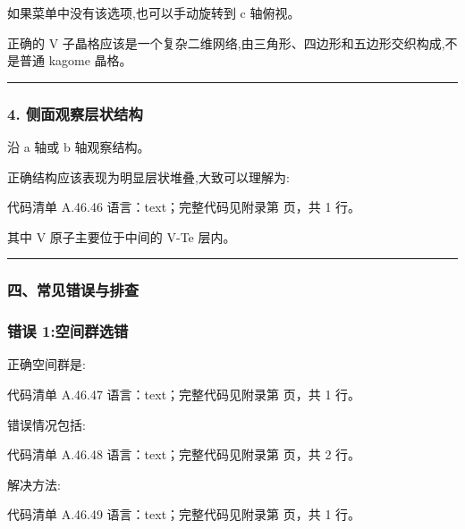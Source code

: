 \documentclass[lang=cn,scheme=chinese,color=blue,device=normal,toc=onecol,math=cm]{elegantbook}
\begin{document}
如果菜单中没有该选项,也可以手动旋转到 c 轴俯视。\par


正确的 V 子晶格应该是一个复杂二维网络,由三角形、四边形和五边形交织构成,不是普通 kagome 晶格。\par


\medskip\hrule\medskip


\subsubsection{4. 侧面观察层状结构}


沿 a 轴或 b 轴观察结构。\par


正确结构应该表现为明显层状堆叠,大致可以理解为:\par


\begin{codeindexbox}{代码清单 A.46.46}
语言：text；完整代码见附录第 \pageref{code:46:46} 页，共 1 行。
\end{codeindexbox}


其中 V 原子主要位于中间的 V-Te 层内。\par


\medskip\hrule\medskip


\subsubsection{四、常见错误与排查}


\subsubsection{错误 1:空间群选错}


正确空间群是:\par


\begin{codeindexbox}{代码清单 A.46.47}
语言：text；完整代码见附录第 \pageref{code:46:47} 页，共 1 行。
\end{codeindexbox}


错误情况包括:\par


\begin{codeindexbox}{代码清单 A.46.48}
语言：text；完整代码见附录第 \pageref{code:46:48} 页，共 2 行。
\end{codeindexbox}


解决方法:\par


\begin{codeindexbox}{代码清单 A.46.49}
语言：text；完整代码见附录第 \pageref{code:46:49} 页，共 1 行。
\end{codeindexbox}
\end{document}
